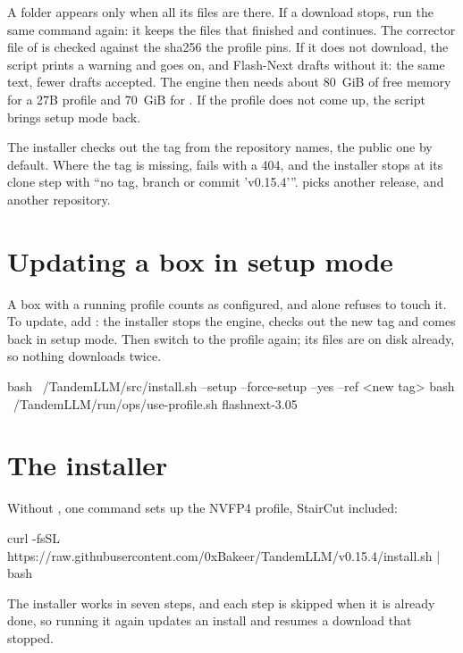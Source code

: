 A folder appears only when all its files are there. If a download stops, run the same command again: it keeps the files that finished and continues. The corrector file of  is checked against the sha256 the profile pins. If it does not download, the script prints a warning and goes on, and Flash-Next drafts without it: the same text, fewer drafts accepted. The engine then needs about 80~GiB of free memory for a 27B profile and 70~GiB for . If the profile does not come up, the script brings setup mode back.

The installer checks out the tag  from the repository  names, the public one by default. Where the tag is missing,  fails with a 404, and the installer stops at its clone step with \enquote{no tag, branch or commit 'v0.15.4'}.  picks another release, and  another repository.

\section{Updating a box in setup mode}\label{sec:update-setup}

A box with a running profile counts as configured, and  alone refuses to touch it. To update, add : the installer stops the engine, checks out the new tag and comes back in setup mode. Then switch to the profile again; its files are on disk already, so nothing downloads twice.

\begin{shell}
bash ~/TandemLLM/src/install.sh --setup --force-setup --yes --ref <new tag>
bash ~/TandemLLM/run/ops/use-profile.sh flashnext-3.05
\end{shell}

\section{The installer}

Without , one command sets up the NVFP4 profile, StairCut included:

\begin{shell}
curl -fsSL https://raw.githubusercontent.com/0xBakeer/TandemLLM/v0.15.4/install.sh | bash
\end{shell}

The installer works in seven steps, and each step is skipped when it is already done, so running it again updates an install and resumes a download that stopped.


